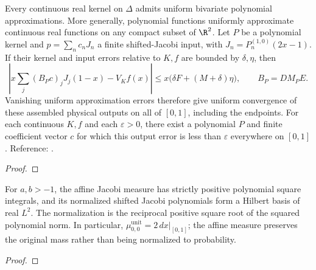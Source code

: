 \begin{supporting}
\begin{theorem}
\label{thm:volterra-finite-approximation}
\leanok
Every continuous real kernel on $\Delta$ admits uniform bivariate polynomial
approximations. More generally, polynomial functions uniformly approximate
continuous real functions on any compact subset of $\R^2$.
Let $P$ be a polynomial kernel and $p=\sum_n c_nJ_n$ a finite shifted-Jacobi
input, with $J_n=P_n^{(1,0)}(2x-1)$. If their kernel and input errors relative
to $K,f$ are bounded by $\delta,\eta$, then
\[
 \left|x\sum_j(B_Pc)_jJ_j(1-x)-V_Kf(x)\right|
 \le x\bigl(\delta F+(M+\delta)\eta\bigr),\qquad B_P=D M_P E.
\]
Vanishing uniform approximation errors therefore give uniform convergence of
these assembled physical outputs on all of $[0,1]$, including the endpoints.
For each continuous $K,f$ and each $\varepsilon>0$, there exist a polynomial
$P$ and finite coefficient vector $c$ for which this output error is less than
$\varepsilon$ everywhere on $[0,1]$.
Reference: \cite[Sections 3.1--3.2]{gutleb-olver}.
\end{theorem}
\begin{proof}
\leanok
\end{proof}



\begin{theorem}
\label{thm:unit-jacobi-completeness}
\leanok
For $a,b>-1$, the affine Jacobi measure has strictly positive polynomial
square integrals, and its normalized shifted Jacobi polynomials form a Hilbert
basis of real $L^2$. The normalization is the reciprocal positive square root
of the squared polynomial norm. In particular,
$\mu_{0,0}^{\mathrm{unit}}=2\,dx|_{[0,1]}$; the affine measure preserves the
original mass rather than being normalized to probability.
\end{theorem}
\begin{proof}
\leanok
\end{proof}


\end{supporting}
